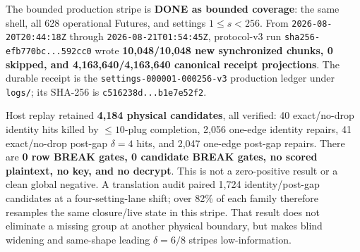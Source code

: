 \documentclass[11pt,a4paper]{article}
\begin{document}
The bounded production stripe is \textbf{DONE as bounded coverage}: the same
shell, all 628 operational Futures, and settings $1\le s<256$. From
\texttt{2026-08-20T20:44:18Z} through \texttt{2026-08-21T01:54:45Z},
protocol-v3 run \texttt{sha256-efb770bc...592cc0} wrote
\textbf{10{,}048/10{,}048 new synchronized chunks, 0 skipped, and
4{,}163{,}640/4{,}163{,}640 canonical receipt projections}. The durable receipt is the
\texttt{settings-000001-000256-v3} production ledger under \texttt{logs/}; its
SHA-256 is \texttt{c516238d...b1e7e52f2}.

Host replay retained \textbf{4{,}184 physical candidates}, all verified: 40
exact/no-drop identity hits killed by $\le10$-plug completion, 2{,}056 one-edge
identity repairs, 41 exact/no-drop post-gap $\delta=4$ hits, and 2{,}047
one-edge post-gap repairs. There are \textbf{0 row BREAK gates, 0 candidate
BREAK gates, no scored plaintext, no key, and no decrypt}. This is not a
zero-positive result or a clean global negative. A translation audit paired
1{,}724 identity/post-gap candidates at a four-setting-lane shift; over 82\% of
each family therefore resamples the same closure/live state in this stripe.
That result does not eliminate a missing group at another physical boundary,
but makes blind widening and same-shape leading $\delta=6/8$ stripes
low-information.
\end{document}
